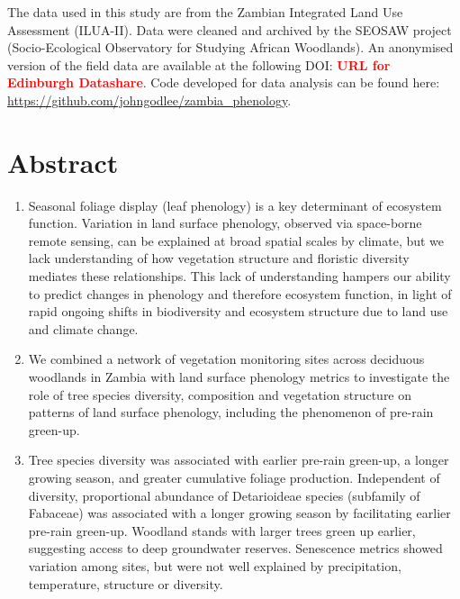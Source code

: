\documentclass[11pt,a4paper]{article}
\newcommand{\todo}[1]{\textcolor{red}{\textbf{#1}}}   %
\begin{document}
The data used in this study are from the Zambian Integrated Land Use Assessment (ILUA-II). Data were cleaned and archived by the SEOSAW project (Socio-Ecological Observatory for Studying African Woodlands). An anonymised version of the field data are available at the following DOI: \todo{URL for Edinburgh Datashare}. Code developed for data analysis can be found here: \url{https://github.com/johngodlee/zambia_phenology}.

\newpage{}
\linenumbers

\section*{Abstract}

\begin{enumerate}
	\item{Seasonal foliage display (leaf phenology) is a key determinant of
		ecosystem function. Variation in land surface phenology, observed
		via space-borne remote sensing, can be explained at broad spatial
		scales by climate, but we lack understanding of how vegetation
		structure and floristic diversity mediates these relationships.
		This lack of understanding hampers our ability to predict changes in phenology and
		therefore ecosystem function, in light of rapid ongoing shifts in
		biodiversity and ecosystem structure due to land use and climate
		change.}

	\item{We combined a network of \nSites{} vegetation monitoring sites
		across deciduous woodlands in Zambia with land surface phenology
		metrics to investigate the role of tree species diversity, composition and
		vegetation structure on patterns of land surface phenology, including the
		phenomenon of pre-rain green-up.} 

	\item{Tree species diversity was associated with earlier pre-rain green-up,
		a longer growing season, and greater cumulative foliage production. Independent of diversity,
		proportional abundance of Detarioideae species (subfamily of Fabaceae)
		was associated with a longer growing season by
		facilitating earlier pre-rain green-up. Woodland stands with larger
		trees green up earlier, suggesting access to deep groundwater reserves. Senescence
		metrics showed variation among sites, but were not well
		explained by precipitation, temperature, structure or diversity.}


\end{enumerate}
\end{document}
